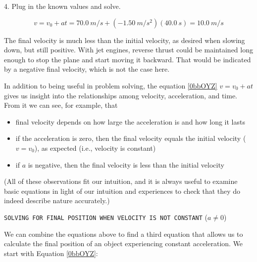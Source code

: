 \documentclass[dvipsnames]{article}
\begin{document}
4. Plug in the known values and solve.

\begin{equation*}
    v = v_0 + at = \SI{70.0}{m/s} + \left(-\SI{1.50}{m/s^2}\right)\left(\SI{40.0}{s}\right) = \SI{10.0}{m/s}
\end{equation*}

The final velocity is much less than the initial velocity, as desired when slowing down, but still positive. With jet engines, reverse thrust could be maintained long enough to stop the plane and start moving it backward. That would be indicated by a negative final velocity, which is not the case here.

\endsolution 

In addition to being useful in problem solving, the equation \eqref{0bbOYZ} $v = v_0 + at$ gives us insight into the relationships among velocity, acceleration, and time. From it we can see, for example, that

\begin{itemize}
    \item final velocity depends on how large the acceleration is and how long it lasts
    \item if the acceleration is zero, then the final velocity equals the initial velocity ($v=v_0$), as expected (i.e., velocity is constant)
    \item if $a$ is negative, then the final velocity is less than the initial velocity
\end{itemize}

(All of these observations fit our intuition, and it is always useful to examine basic equations in light of our intuition and experiences to check that they do indeed describe nature accurately.)


\vspace{1em}

\cyanhrule

\vspace{1ex}

\texttt{SOLVING FOR FINAL POSITION WHEN VELOCITY IS NOT CONSTANT} ($a \neq 0 $)

\vspace{1ex}

We can combine the equations above to find a third equation that allows us to calculate the final position of an object experiencing constant acceleration. We start with Equation \eqref{0bbOYZ}:
\end{document}
